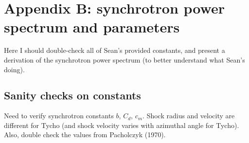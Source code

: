 \documentclass[10pt]{article}
\begin{document}
\section*{Appendix B: synchrotron power spectrum and parameters}

Here I should double-check all of Sean's provided constants, and
present a derivation of the synchrotron power spectrum (to better understand
what Sean's doing).

\subsection*{Sanity checks on constants}

Need to verify synchrotron constants $b$, $C_d$, $c_m$.  Shock radius and
velocity are different for Tycho (and shock velocity varies with azimuthal
angle for Tycho).  Also, double check the values from Pacholczyk (1970).
\end{document}
